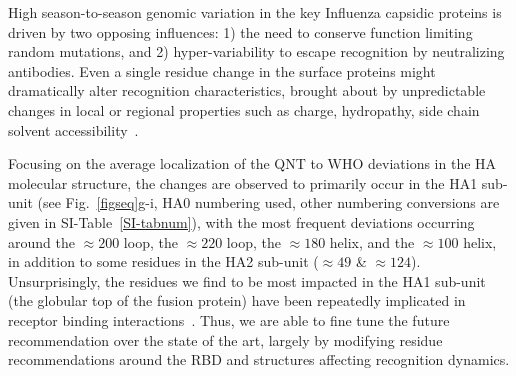\documentclass[onecolumn, compsoc,10pt]{IEEEtran}
\begin{document}
{High season-to-season genomic variation in the key  Influenza capsidic proteins is driven by two opposing influences: 1) the need to conserve function  limiting random mutations, and 2) hyper-variability to escape recognition by neutralizing antibodies. Even a  single residue change in the surface proteins might dramatically alter recognition characteristics, brought about by unpredictable~\cite{carugo2001normalized,righetto2014comparative} changes in local or regional properties such as charge, hydropathy, side chain solvent accessibility~\cite{lee1971interpretation,shrake1973environment,momen2008impact,adamczak2005combining}.

Focusing on the average localization of the QNT to WHO deviations in the HA molecular  structure, the changes are observed to primarily occur in the HA1 sub-unit (see Fig.~\ref{figseq}g-i, HA0 numbering used, other numbering conversions are given in SI-Table~\ref{SI-tabnum}), with the most frequent deviations  occurring around the $\approx 200$ loop, the $\approx 220$ loop, the $\approx 180$ helix, and the $\approx 100$ helix, in addition to some residues in the HA2 sub-unit ($\approx 49$ \& $\approx 124$). Unsurprisingly, the residues we find to be most impacted in the HA1 sub-unit (the globular top of the fusion protein) have been repeatedly implicated in receptor binding interactions~\cite{tzarum2015structure,lazniewski2018structural,garcia2015dynamic}. Thus, we are able to fine tune the future recommendation over the state of the art, largely by modifying residue recommendations around the RBD and  structures affecting recognition dynamics.



}
\end{document}
